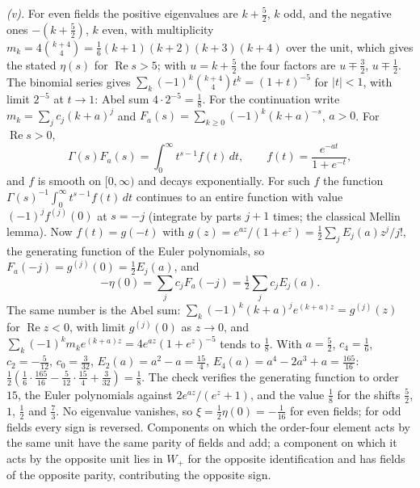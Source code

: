 \emph{(v).} For even fields the positive eigenvalues are $k + \tfrac52$, $k$ odd, and the negative ones $-(k + \tfrac52)$, $k$ even, with multiplicity $m_{k} = 4\binom{k+4}{4} = \tfrac16(k+1)(k+2)(k+3)(k+4)$ over the unit, which gives the stated $\eta(s)$ for $\operatorname{Re}s > 5$; with $u = k + \tfrac52$ the four factors are $u \mp \tfrac32$, $u \mp \tfrac12$. The binomial series gives $\sum_{k}(-1)^{k}\binom{k+4}{4}t^{k} = (1 + t)^{-5}$ for $|t| < 1$, with limit $2^{-5}$ at $t \to 1$: Abel sum $4 \cdot 2^{-5} = \tfrac18$. For the continuation write $m_{k} = \sum_{j}c_{j}(k + a)^{j}$ and $F_{a}(s) = \sum_{k \ge 0}(-1)^{k}(k + a)^{-s}$, $a > 0$. For $\operatorname{Re}s > 0$,
\[
\Gamma(s)F_{a}(s) = \int_{0}^{\infty}t^{s-1}f(t)\,dt, \qquad f(t) = \frac{e^{-at}}{1 + e^{-t}},
\]
and $f$ is smooth on $[0, \infty)$ and decays exponentially. For such $f$ the function $\Gamma(s)^{-1}\int_{0}^{\infty}t^{s-1}f(t)\,dt$ continues to an entire function with value $(-1)^{j}f^{(j)}(0)$ at $s = -j$ (integrate by parts $j + 1$ times; the classical Mellin lemma). Now $f(t) = g(-t)$ with $g(z) = e^{az}/(1 + e^{z}) = \tfrac12\sum_{j}E_{j}(a)z^{j}/j!$, the generating function of the Euler polynomials, so $F_{a}(-j) = g^{(j)}(0) = \tfrac12E_{j}(a)$, and
\[
-\eta(0) = \sum_{j}c_{j}F_{a}(-j) = \tfrac12\sum_{j}c_{j}E_{j}(a) .
\]
The same number is the Abel sum: $\sum_{k}(-1)^{k}(k + a)^{j}e^{(k + a)z} = g^{(j)}(z)$ for $\operatorname{Re}z < 0$, with limit $g^{(j)}(0)$ as $z \to 0$, and $\sum_{k}(-1)^{k}m_{k}e^{(k+a)z} = 4e^{az}(1 + e^{z})^{-5}$ tends to $\tfrac18$. With $a = \tfrac52$, $c_{4} = \tfrac16$, $c_{2} = -\tfrac5{12}$, $c_{0} = \tfrac3{32}$, $E_{2}(a) = a^{2} - a = \tfrac{15}{4}$, $E_{4}(a) = a^{4} - 2a^{3} + a = \tfrac{165}{16}$: $\tfrac12(\tfrac16 \cdot \tfrac{165}{16} - \tfrac5{12} \cdot \tfrac{15}{4} + \tfrac3{32}) = \tfrac18$. The check verifies the generating function to order $15$, the Euler polynomials against $2e^{az}/(e^{z} + 1)$, and the value $\tfrac18$ for the shifts $\tfrac52$, $1$, $\tfrac12$ and $\tfrac73$. No eigenvalue vanishes, so $\xi = \tfrac12\eta(0) = -\tfrac1{16}$ for even fields; for odd fields every sign is reversed. Components on which the order-four element acts by the same unit have the same parity of fields and add; a component on which it acts by the opposite unit lies in $W_{+}$ for the opposite identification and has fields of the opposite parity, contributing the opposite sign.
